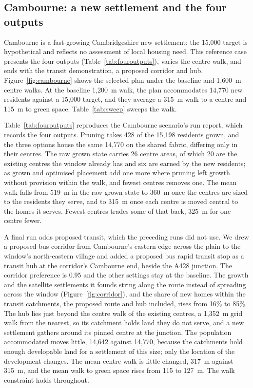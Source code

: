 \documentclass[11pt]{article}
\begin{document}
\subsection{Cambourne: a new settlement and the four outputs}

Cambourne is a fast-growing Cambridgeshire new settlement; the
15{,}000 target is hypothetical and reflects no assessment of
local housing need. This reference case presents the four outputs
(Table~\ref{tab:fouroutputs}), varies the centre walk, and ends with
the transit demonstration, a proposed
corridor and hub. Figure~\ref{fig:cambourne}
shows the selected plan under the
baseline and 1{,}600~m centre walks. At the baseline 1{,}200~m
walk, the plan accommodates 14{,}770 new residents against a
15{,}000 target, and they average a 315~m walk to a centre and
115~m to green space. Table~\ref{tab:sweep} sweeps the walk.

Table~\ref{tab:fouroutputs} reproduces the Cambourne scenario's run
report, which records the four outputs. Pruning takes 428 of the
15{,}198 residents grown, and the three options house the same
14{,}770 on the shared fabric, differing only in their centres. The
raw grown state carries 26 centre areas, of which 20 are the
existing centres the window already has and six are earned by the
new residents; as grown and optimised placement add one more where
pruning left growth without provision within the walk, and fewest
centres removes one. The mean walk falls from 519~m in the raw grown
state to 360~m once the centres are sized to the residents they
serve, and to 315~m once each centre is moved central to the homes
it serves. Fewest centres trades some of that back, 325~m for one
centre fewer.

A final run adds proposed transit, which the preceding runs did not
use. We drew a proposed bus
corridor from Cambourne's eastern edge across the plain to the
window's north-eastern village and added a proposed bus rapid transit
stop as a transit hub at the corridor's Cambourne end, beside the
A428 junction.
The corridor preference is 0.95 and the other settings stay at the
baseline. The growth and the satellite settlements it founds string
along the route
instead of spreading across the window (Figure~\ref{fig:corridor}),
and the share of new homes within the transit catchments, the
proposed route and hub included, rises from 16\% to 85\%. The hub lies just beyond the centre walk of the
existing centres, a 1{,}352~m grid walk from the nearest, so its
catchment holds land they do not serve, and a new
settlement gathers around its pinned centre at the junction. The
population accommodated moves little, 14{,}642 against 14{,}770,
because the catchments hold enough developable land for a
settlement of this size; only the location of the development
changes. The mean centre walk is little changed, 317~m
against 315~m, and the mean walk to green space rises from 115 to
127~m. The walk constraint holds throughout.
\end{document}
